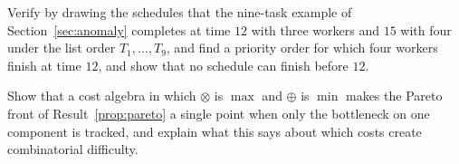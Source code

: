 \begin{exercise}
Verify by drawing the schedules that the nine-task example of Section~\ref{sec:anomaly} completes at time $12$ with three workers and $15$ with four under the list order $T_1,\dots,T_9$, and find a priority order for which four workers finish at time $12$, and show that no schedule can finish before $12$.\label{ex2:nine-task}
\end{exercise}

\begin{exercise}
Show that a cost algebra in which $\otimes$ is $\max$ and $\oplus$ is $\min$ makes the Pareto front of Result~\ref{prop:pareto} a single point when only the bottleneck on one component is tracked, and explain what this says about which costs create combinatorial difficulty.
\end{exercise}

